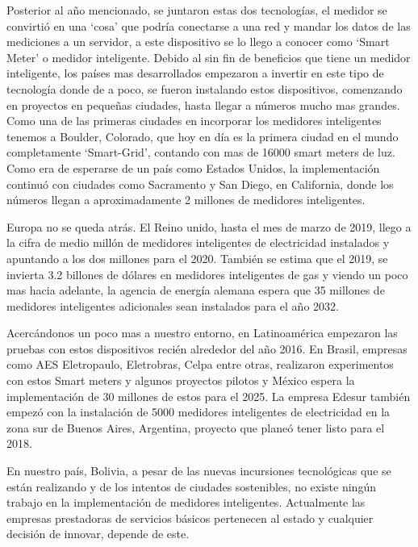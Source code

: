 Posterior al año mencionado, se juntaron estas dos tecnologías, el medidor se convirtió en
una ‘cosa’ que podría conectarse a una red y mandar los datos de las mediciones a un
servidor, a este dispositivo se lo llego a conocer como ‘Smart Meter’ o medidor
inteligente.
Debido al sin fin de beneficios que tiene un medidor inteligente, los países mas
desarrollados empezaron a invertir en este tipo de tecnología donde de a poco, se
fueron instalando estos dispositivos, comenzando en proyectos en pequeñas ciudades, hasta llegar a números mucho mas grandes. Como una de las primeras ciudades en
incorporar los medidores inteligentes tenemos a Boulder, Colorado, que hoy en día es la
primera ciudad en el mundo completamente ‘Smart-Grid’, contando con mas de 16000
smart meters de luz. Como era de esperarse de un país como Estados Unidos, la
implementación continuó con ciudades como Sacramento y San Diego, en California,
donde los números llegan a aproximadamente 2 millones de medidores inteligentes. \cite{kingsburyalex}

Europa no se queda atrás. El Reino unido, hasta el mes de marzo de 2019, llego a la cifra
de medio millón de medidores inteligentes de electricidad instalados y apuntando a los
dos millones para el 2020. \cite{smartenergyinternational} También se estima que el 2019, se invierta 3.2 billones de
dólares en medidores inteligentes de gas \cite{smartenergyintgas} y viendo un poco mas hacia adelante, la
agencia de energía alemana espera que 35 millones de medidores inteligentes
adicionales sean instalados para el año 2032. \cite{deutscheenergie-agentur}

Acercándonos un poco mas a nuestro entorno, en Latinoamérica empezaron las pruebas
con estos dispositivos recién alrededor del año 2016. En Brasil, empresas como AES
Eletropaulo, Eletrobras, Celpa entre otras, realizaron experimentos con estos Smart meters
y algunos proyectos pilotos y México espera la implementación de 30 millones de estos
para el 2025.\cite{smartenergy} La empresa Edesur también empezó con la instalación de 5000
medidores inteligentes de electricidad en la zona sur de Buenos Aires, Argentina,
proyecto que planeó tener listo para el 2018. \cite{demartinicecilia}

En nuestro país, Bolivia, a pesar de las nuevas incursiones tecnológicas que se están
realizando y de los intentos de ciudades sostenibles, no existe ningún trabajo en la
implementación de medidores inteligentes. Actualmente las empresas prestadoras de
servicios básicos pertenecen al estado y cualquier decisión de innovar, depende de este.

